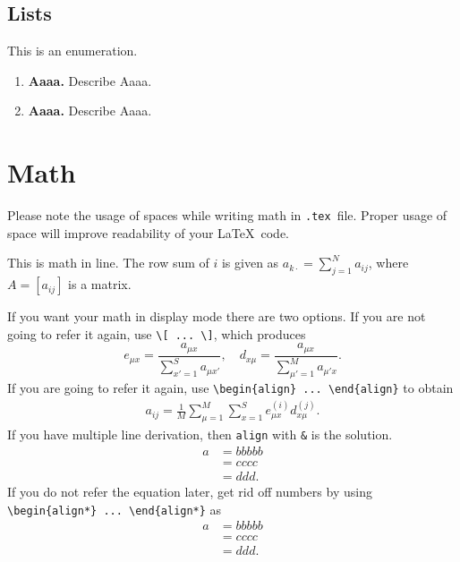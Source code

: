 \documentclass[pre,twocolumn,showkeys,longbibliography]{revtex4-1}
\newcommand{\hbCode}[1]{\texttt{#1}}
\theoremstyle{plain}%
\theoremstyle{definition}
\theoremstyle{remark}
\newcommand{\hbDTex}{\hbCode{.tex}}
\begin{document}
\subsection{Lists}

This is an enumeration.
\begin{enumerate}

	\item 
	\textbf{Aaaa.}
	Describe Aaaa.

	\item 
	\textbf{Aaaa.}
	Describe Aaaa.

\end{enumerate}




\section{Math}

Please note the usage of spaces while writing math in \hbDTex\ file.
Proper usage of space will improve readability of your \LaTeX\ code.

This is math in line. 
The row sum of $i$ is given as
$
	a_{k \cdot} = \sum_{j=1}^{N} a_{i j}
$,
where $A = [a_{i j}]$ is a matrix.

If you want your math in display mode there are two options. 
If you are not going to refer it again, 
use \verb!\[ ... \]!, 
which produces
\[
	e_{\mu x} 
	= \frac{a_{\mu x}}{\sum_{x'=1}^{S} a_{\mu x'}},
	\quad
	d_{x \mu} 
	= \frac{a_{\mu x}}{\sum_{\mu'=1}^{M} a_{\mu'x}}.
\]
If you are going to refer it again, 
use \verb!\begin{align} ... \end{align}! to obtain
\begin{align}
	a_{ij} =
		\frac{1}{M}
		\sum_{\mu = 1}^{M} 
		{\sum_{x = 1}^{S} 
			e_{\mu x}^{(i)}
			d_{x \mu}^{(j)} }.
	\label{eq:aij}
\end{align}
If you have multiple line derivation,
then \hbCode{align} with \verb!&! is the solution.
\begin{align}
	a 
	&= bbbbb\\
	&= cccc\\
	&= ddd.
\end{align}
If you do not refer the equation later,
get rid off numbers by using 
\verb!\begin{align*} ... \end{align*}!
as
\begin{align*}
	a 
	&= bbbbb\\
	&= cccc\\
	&= ddd.
\end{align*}
\end{document}
